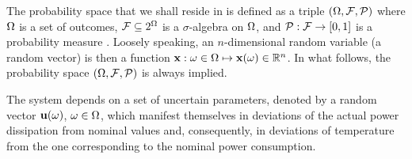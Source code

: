 The probability space that we shall reside in is defined as a triple $(\Omega, \mathcal{F}, \mathcal{P})$ where $\Omega$ is a set of outcomes, $\mathcal{F} \subseteq 2^\Omega$ is a $\sigma$-algebra on $\Omega$, and $\mathcal{P}: \mathcal{F} \to [0, 1]$ is a probability measure \cite{maitre2010}.
Loosely speaking, an $n$-dimensional random variable (a random vector) is then a function $\mathbf{x}: \omega \in \Omega \mapsto \mathbf{x}(\omega) \in \mathbb{R}^n$.
In what follows, the probability space $(\Omega, \mathcal{F}, \mathcal{P})$ is always implied.

The system depends on a set of uncertain parameters, denoted by a random vector $\mathbf{u}(\omega)$, $\omega \in \Omega$, which manifest themselves in deviations of the actual power dissipation from nominal values and, consequently, in deviations of temperature from the one corresponding to the nominal power consumption.
